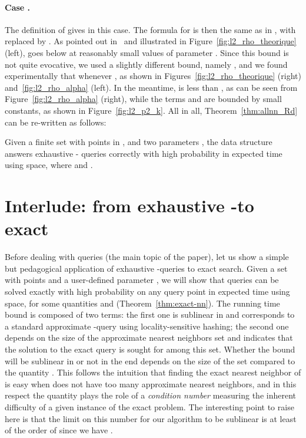 \paragraph{Case .}
The definition of  gives 
in this case. The formula for  is then the same as in ,
with  replaced by . As pointed
out in~\cite{DIIM04} and illustrated in
Figure~\ref{fig:l2_rho_theorique} (left),  goes below
 at reasonably small values of
parameter . Since this bound is not quite evocative, we used a
slightly different bound, namely , and we
found experimentally that 
whenever , as shown in
Figures~\ref{fig:l2_rho_theorique} (right) and~\ref{fig:l2_rho_alpha}
(left). In the meantime,  is less than , as can be
seen from Figure~\ref{fig:l2_rho_alpha} (right), while the terms
 and  are bounded
by small constants, as shown in Figure~\ref{fig:l2_p2_k}. All in all,
Theorem~\ref{thm:allnn_Rd} can be re-written as follows:
\addtocounter{thm}{-1}
\begin{thm}[case ] \label{thm:allnn_Rd_l2}
  Given a finite set  with  points in , and two
  parameters , the  data
    structure answers exhaustive -\pleb
  queries correctly with high probability in expected  time using
     space, where  and .
\end{thm}




\section{Interlude: from exhaustive -\pleb to exact \nn}
\label{sec:exact-nn}

Before dealing with \rnn queries (the main topic of the paper),
let us show a simple but pedagogical application of exhaustive
-\pleb queries to exact  search. Given a set  with  points
and a user-defined parameter , we will show that \nn queries can
be solved exactly with high probability on any query point  in
expected  time
using  space, for some quantities
 and 
(Theorem~\ref{thm:exact-nn}). The running time bound is composed of
two terms: the first one is sublinear in  and corresponds to a
standard approximate -\nn query using locality-sensitive hashing;
the second one depends on the size of the approximate nearest
neighbors set  and indicates that the solution to
the exact query is sought for among this set. Whether the bound will
be sublinear in  or not in the end depends on the size of the set
compared to the quantity . This follows the intuition
that finding the exact nearest neighbor of  is easy when  does
not have too many approximate nearest neighbors, and in this respect
the quantity  plays the role of a {\em
  condition number} measuring the inherent difficulty of a given
instance of the exact  problem. The interesting point to raise
here is that the limit on this number for our algorithm to be
sublinear is at least of the order of  since we
have .



